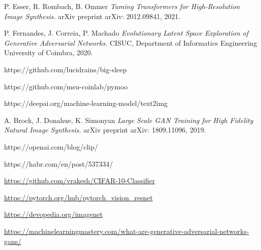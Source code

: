 \documentclass[12pt,a4paper,openany]{book}
\begin{document}
\begin{thebibliography}{a,b,c}
 P. Esser, R. Rombach, B. Ommer {\it Taming Transformers for High-Resolution Image Synthesis.} arXiv preprint arXiv: 2012.09841, 2021.

 P. Fernandes, J. Correia, P. Machado {\it Evolutionary Latent Space Exploration of Generative Adversarial Networks.} CISUC, Department of Informatics Engineering University of Coimbra, 2020.

 https://github.com/lucidrains/big-sleep

 https://github.com/msu-coinlab/pymoo

 https://deepai.org/machine-learning-model/text2img

 A. Brock, J. Donahue, K. Simonyan {\it Large Scale GAN Training for High Fidelity Natural Image Synthesis.} arXiv preprint arXiv: 1809.11096, 2019.

 https://openai.com/blog/clip/

 https://habr.com/en/post/537334/

 \url{https://github.com/vrakesh/CIFAR-10-Classifier}

 \url{https://pytorch.org/hub/pytorch_vision_resnet}

 \url{https://devopedia.org/imagenet}

 \url{https://machinelearningmastery.com/what-are-generative-adversarial-networks-gans/}

\end{thebibliography}
\end{document}
